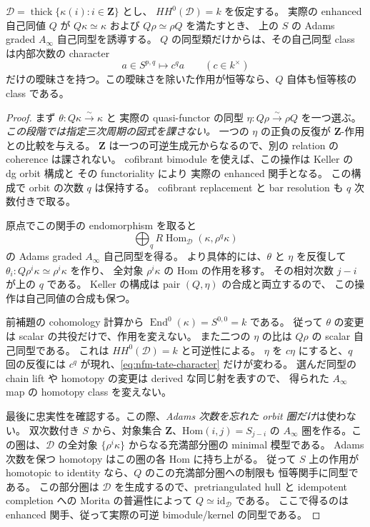 \begin{lemma}
\label{lem:nfm-kernel-orbit-algebra}
$\mathcal D=\operatorname{thick}\{\kappa(i):i\in\mathbf Z\}$ とし、
$HH^0(\mathcal D)=k$ を仮定する。
実際の enhanced 自己同値 $Q$ が
$Q\kappa\simeq\kappa$ および $Q\rho\simeq\rho Q$ を満たすとき、
上の $S$ の Adams graded $A_\infty$ 自己同型を誘導する。
$Q$ の同型類だけからは、その自己同型 class は内部次数の character
\begin{equation}\label{eq:nfm-tate-character}
a\in S^{p,q}\longmapsto c^q a\qquad(c\in k^\times)
\end{equation}
だけの曖昧さを持つ。この曖昧さを除いた作用が恒等なら、$Q$ 自体も恒等核の class である。
\end{lemma}

\begin{proof}
まず $\theta:Q\kappa\xrightarrow{\sim}\kappa$ と
実際の quasi-functor の同型 $\eta:Q\rho\xrightarrow{\sim}\rho Q$ を一つ選ぶ。
\emph{この段階では指定三次周期の図式を課さない。}
一つの $\eta$ の正負の反復が $\mathbf Z$-作用との比較を与える。
$\mathbf Z$ は一つの可逆生成元からなるので、別の relation の coherence は課されない。
cofibrant bimodule を使えば、この操作は Keller の dg orbit 構成と
その functoriality\cite[Sections~9.3--9.4]{NFMKellerOrbit} により
実際の enhanced 関手となる。
この構成で orbit の次数 $q$ は保持する。
cofibrant replacement と bar resolution も $q$ 次数付きで取る。

原点でこの関手の endomorphism を取ると
\[
 \bigoplus_q R\operatorname{Hom}_{\mathcal D}(\kappa,\rho^q\kappa)
\]
の Adams graded $A_\infty$ 自己同型を得る。
より具体的には、$\theta$ と $\eta$ を反復して
$\theta_i:Q\rho^i\kappa\simeq\rho^i\kappa$ を作り、
全対象 $\rho^i\kappa$ の Hom の作用を移す。
その相対次数 $j-i$ が上の $q$ である。
Keller の構成は pair $(Q,\eta)$ の合成と両立するので、
この操作は自己同値の合成も保つ。

前補題の cohomology 計算から
$\operatorname{End}^0(\kappa)=S^{0,0}=k$ である。
従って $\theta$ の変更は scalar の共役だけで、作用を変えない。
また二つの $\eta$ の比は $Q\rho$ の scalar 自己同型である。
これは $HH^0(\mathcal D)=k$ と可逆性による。
$\eta$ を $c\eta$ にすると、$q$ 回の反復には $c^q$ が現れ、\eqref{eq:nfm-tate-character} だけが変わる。
選んだ同型の chain lift や homotopy の変更は derived な同じ射を表すので、
得られた $A_\infty$ map の homotopy class を変えない。

最後に忠実性を確認する。この際、\emph{Adams 次数を忘れた orbit 圏だけ}は使わない。
双次数付き $S$ から、対象集合 $\mathbf Z$、Hom$(i,j)=S_{j-i}$ の
$A_\infty$ 圏を作る。この圏は、$\mathcal D$ の全対象
$\{\rho^i\kappa\}$ からなる充満部分圏の minimal 模型である。
Adams 次数を保つ homotopy はこの圏の各 Hom に持ち上がる。
従って $S$ 上の作用が homotopic to identity なら、$Q$ のこの充満部分圏への制限も
恒等関手に同型である。
この部分圏は $\mathcal D$ を生成するので、pretriangulated hull と idempotent completion
への Morita の普遍性によって $Q\simeq\mathrm{id}_{\mathcal D}$ である。
ここで得るのは enhanced 関手、従って実際の可逆 bimodule/kernel の同型である。
\end{proof}

